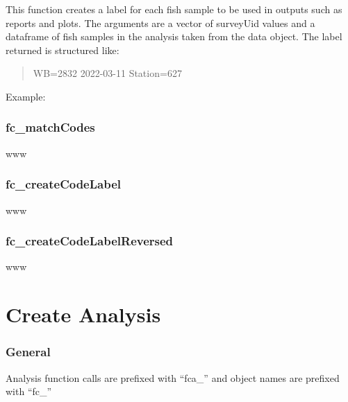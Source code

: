 \documentclass[
  letterpaper,
  DIV=11,
  numbers=noendperiod]{scrreprt}
\newenvironment{Shaded}{\begin{snugshade}}{\end{snugshade}}
\newcommand{\AttributeTok}[1]{\textcolor[rgb]{0.40,0.45,0.13}{#1}}
\newcommand{\FunctionTok}[1]{\textcolor[rgb]{0.28,0.35,0.67}{#1}}
\newcommand{\NormalTok}[1]{\textcolor[rgb]{0.00,0.23,0.31}{#1}}
\newcommand{\SpecialCharTok}[1]{\textcolor[rgb]{0.37,0.37,0.37}{#1}}
\begin{document}
This function creates a label for each fish sample to be used in outputs
such as reports and plots. The arguments are a vector of surveyUid
values and a dataframe of fish samples in the analysis taken from the
data object. The label returned is structured like:

\begin{quote}
WB=2832 \textbar{} 2022-03-11 \textbar{} Station=627
\end{quote}

Example:

\begin{Shaded}
\end{Shaded}

\subsection{fc\_matchCodes}\label{fc_matchcodes}

www

\subsection{fc\_createCodeLabel}\label{fc_createcodelabel}

www

\subsection{fc\_createCodeLabelReversed}\label{fc_createcodelabelreversed}

www

\chapter{Create Analysis}\label{create-analysis}

\subsection{General}\label{general}

Analysis function calls are prefixed with ``fca\_'' and object names are
prefixed with ``fc\_''
\end{document}
